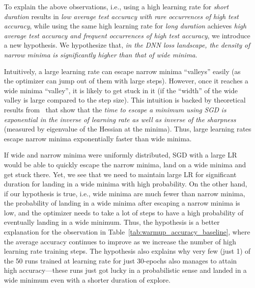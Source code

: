 \documentclass[twoside,11pt]{article}
\begin{document}
To explain the above observations, i.e., using a high learning rate for {\it short duration} results in {\it low average test accuracy with rare occurrences of high test accuracy}, while using the same high learning rate for {\it long duration} achieves {\it high average test accuracy and frequent occurrences of high test accuracy}, we introduce a new hypothesis. We hypothesize that, \textit{in the DNN loss landscape, the density of narrow minima is significantly  higher than that of wide minima}. 

Intuitively, a large learning rate can escape narrow minima ``valleys'' easily (as the optimizer can jump out of them with large steps). However, once it reaches a wide minima ``valley'', it is likely to get stuck in it (if the ``width'' of the wide valley is large compared to the step size). This intuition is backed by theoretical results from~\citet{xie2020diffusion} that show that the {\it time to escape a minimum using SGD is exponential in the inverse of learning rate as well as inverse of the sharpness} (measured by eigenvalue of the Hessian at the minima). Thus, large learning rates escape narrow minima exponentially faster than wide minima. 

If wide and narrow minima were uniformly distributed, SGD with a large LR would be able to quickly escape the narrow minima, land on a wide minima and get stuck there. Yet, we see that we need to maintain large LR for significant duration for landing in a wide minima with high probability. On the other hand, if our hypothesis is true, i.e., wide minima are much fewer than narrow minima, the probability of landing in a wide minima after escaping a narrow minima is low, and the optimizer needs to take a lot of steps to have a high probability of eventually landing in a wide minimum. Thus, the hypothesis is a better explanation for the observation in Table~\ref{tab:warmup_accuracy_baseline}, where the average accuracy continues to improve as we increase the number of high learning rate training steps. The hypothesis also explains why very few (just 1) of the 50 runs trained at  learning rate for just 30-epochs also manages to attain high accuracy---these runs just got lucky in a  probabilistic sense and landed in a wide minimum even with a shorter duration of explore.
\end{document}

